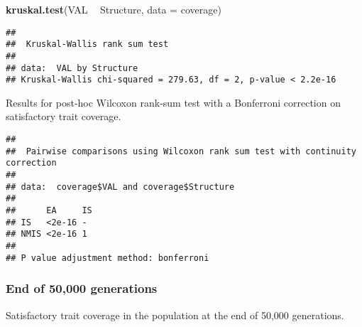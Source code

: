 \documentclass[]{book}
\newenvironment{Shaded}{\begin{snugshade}}{\end{snugshade}}
\newcommand{\DataTypeTok}[1]{\textcolor[rgb]{0.13,0.29,0.53}{#1}}
\newcommand{\KeywordTok}[1]{\textcolor[rgb]{0.13,0.29,0.53}{\textbf{#1}}}
\newcommand{\NormalTok}[1]{#1}
\newcommand{\OperatorTok}[1]{\textcolor[rgb]{0.81,0.36,0.00}{\textbf{#1}}}
\newcommand{\OtherTok}[1]{\textcolor[rgb]{0.56,0.35,0.01}{#1}}
\newcommand{\StringTok}[1]{\textcolor[rgb]{0.31,0.60,0.02}{#1}}
\begin{document}
\begin{Shaded}
\begin{Highlighting}[]
\KeywordTok{kruskal.test}\NormalTok{(VAL }\OperatorTok{~}\StringTok{ }\NormalTok{Structure, }\DataTypeTok{data =}\NormalTok{ coverage)}
\end{Highlighting}
\end{Shaded}

\begin{verbatim}
## 
##  Kruskal-Wallis rank sum test
## 
## data:  VAL by Structure
## Kruskal-Wallis chi-squared = 279.63, df = 2, p-value < 2.2e-16
\end{verbatim}

Results for post-hoc Wilcoxon rank-sum test with a Bonferroni correction on satisfactory trait coverage.

\begin{Shaded}
\end{Shaded}

\begin{verbatim}
## 
##  Pairwise comparisons using Wilcoxon rank sum test with continuity correction 
## 
## data:  coverage$VAL and coverage$Structure 
## 
##      EA     IS
## IS   <2e-16 - 
## NMIS <2e-16 1 
## 
## P value adjustment method: bonferroni
\end{verbatim}

\hypertarget{end-of-50000-generations-18}{%
\subsubsection{End of 50,000 generations}\label{end-of-50000-generations-18}}

Satisfactory trait coverage in the population at the end of 50,000 generations.
\end{document}
